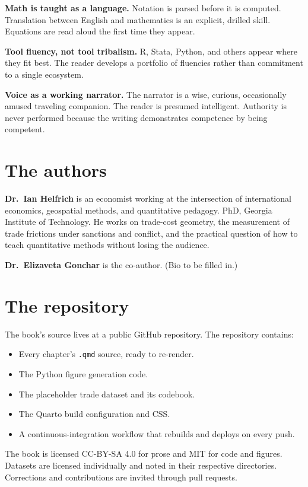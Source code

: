 \documentclass[
  letterpaper,
  11pt,
  twoside,
  openany]{scrbook}
\providecommand{\tightlist}{%
  \setlength{\itemsep}{0pt}\setlength{\parskip}{0pt}}
\begin{document}
\textbf{Math is taught as a language.} Notation is parsed before it is
computed. Translation between English and mathematics is an explicit,
drilled skill. Equations are read aloud the first time they appear.

\textbf{Tool fluency, not tool tribalism.} R, Stata, Python, and others
appear where they fit best. The reader develops a portfolio of fluencies
rather than commitment to a single ecosystem.

\textbf{Voice as a working narrator.} The narrator is a wise, curious,
occasionally amused traveling companion. The reader is presumed
intelligent. Authority is never performed because the writing
demonstrates competence by being competent.

\section{The authors}\label{the-authors}

\textbf{Dr.~Ian Helfrich} is an economist working at the intersection of
international economics, geospatial methods, and quantitative pedagogy.
PhD, Georgia Institute of Technology. He works on trade-cost geometry,
the measurement of trade frictions under sanctions and conflict, and the
practical question of how to teach quantitative methods without losing
the audience.

\textbf{Dr.~Elizaveta Gonchar} is the co-author. (Bio to be filled in.)

\section{The repository}\label{the-repository}

The book's source lives at a public GitHub repository. The repository
contains:

\begin{itemize}
\tightlist
\item
  Every chapter's \texttt{.qmd} source, ready to re-render.
\item
  The Python figure generation code.
\item
  The placeholder trade dataset and its codebook.
\item
  The Quarto build configuration and CSS.
\item
  A continuous-integration workflow that rebuilds and deploys on every
  push.
\end{itemize}

The book is licensed CC-BY-SA 4.0 for prose and MIT for code and
figures. Datasets are licensed individually and noted in their
respective directories. Corrections and contributions are invited
through pull requests.
\end{document}
